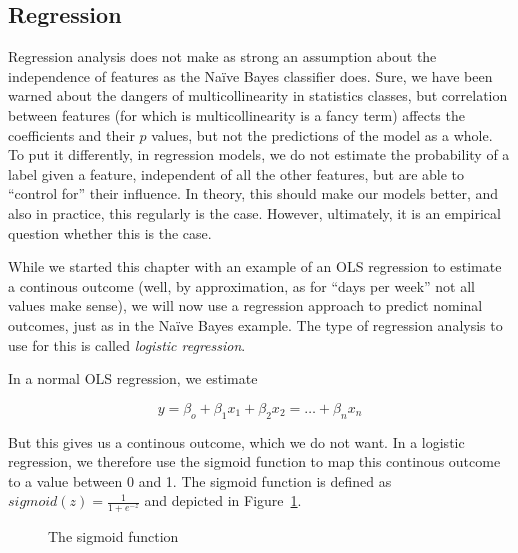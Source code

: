 \subsection{Regression}
Regression analysis does not make as strong an assumption about the independence of features as the Na\"ive Bayes classifier does.
Sure, we have been warned about the dangers of multicollinearity in statistics classes,
but correlation between features (for which is multicollinearity is a fancy term)
affects the coefficients and their $p$ values, but not the predictions of the model
as a whole.
To put it differently, in regression models, we do not estimate the probability of a label given a feature, independent of all the other features, but are able to ``control for'' their influence.
In theory, this should make our models better, and also in practice, this regularly is
the case. However, ultimately, it is an empirical question whether this is the case.

While we started this chapter with an example of an OLS regression to estimate a
continous outcome (well, by approximation, as for ``days per week'' not all values make sense), we will now use a regression approach to predict nominal outcomes, just as in the Na\"ive Bayes example.
The type of regression analysis to use for this is called \emph{logistic regression}.

In a normal OLS regression, we estimate

$$y = \beta_o + \beta_1 x_1 + \beta_2 x_2 = \ldots + \beta_n x_n$$

But this gives us a continous outcome, which we do not want. In a logistic regression, we therefore use the sigmoid function to map this continous outcome to a value between 0 and 1. The sigmoid function is defined as
$sigmoid(z) = \frac{1}{1 + e^{-z}}$
and depicted in Figure~\ref{fig:sigmoid}.

\begin{figure}
  \centering
{}
\caption{\label{fig:sigmoid} The sigmoid function}
\end{figure}


